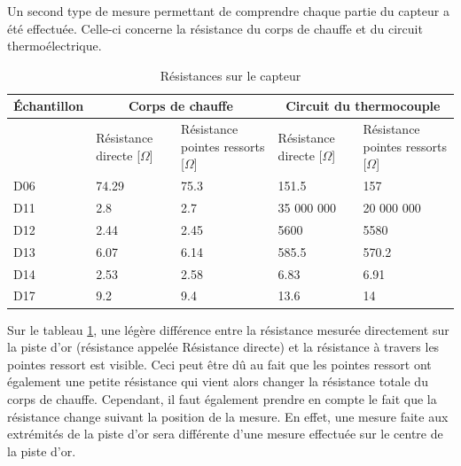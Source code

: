 Un second type de mesure permettant de comprendre chaque partie du \gls{capteur} a été effectuée. Celle-ci concerne la résistance du corps de
chauffe et du circuit thermoélectrique.
\begin{table}[H]
    \begin{center}
        \begin{tabular}{|p{2cm}|p{2.5cm}|p{2.5cm}|p{2.5cm}|p{2.5cm}|}
            \hline
            Échantillon & \multicolumn{2}{|c|}{Corps de chauffe} & \multicolumn{2}{|c|}{Circuit du thermocouple}                                                                          \\
            \hline
                        & Résistance directe [$\Omega$]          & Résistance pointes ressorts [$\Omega$]        & Résistance directe [$\Omega$] & Résistance pointes ressorts [$\Omega$] \\
            \hline
            D06         & 74.29                                  & 75.3                                          & 151.5                         & 157                                    \\
            \hline
            D11         & 2.8                                    & 2.7                                           & 35 000 000                    & 20 000 000                             \\
            \hline
            D12         & 2.44                                   & 2.45                                          & 5600                          & 5580                                   \\
            \hline
            D13         & 6.07                                   & 6.14                                          & 585.5                         & 570.2                                  \\
            \hline
            D14         & 2.53                                   & 2.58                                          & 6.83                          & 6.91                                   \\
            \hline
            D17         & 9.2                                    & 9.4                                           & 13.6                          & 14                                     \\
            \hline
        \end{tabular}
        \caption{Résistances sur le capteur}
        \label{tab:resistancePointeRessort}
    \end{center}
\end{table}
Sur le tableau \ref*{tab:resistancePointeRessort}, une légère différence entre la résistance mesurée directement sur la piste d'or (résistance 
appelée Résistance directe) et la résistance à travers les pointes ressort est visible. Ceci peut être dû au fait que les pointes ressort ont 
également une petite résistance qui vient alors changer la résistance totale du corps de chauffe. Cependant, il faut également prendre en 
compte le fait que la résistance change suivant la position de la mesure. En effet, une mesure faite aux extrémités de la piste d'or sera différente 
d'une mesure effectuée sur le centre de la piste d'or. \\

